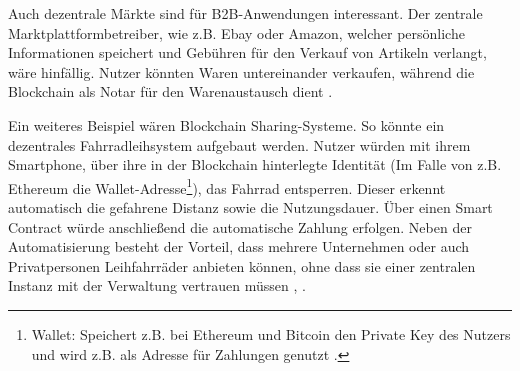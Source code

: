 Auch dezentrale Märkte sind für B2B-Anwendungen interessant. Der zentrale Marktplattformbetreiber, wie z.B. Ebay oder Amazon, welcher persönliche Informationen speichert und Gebühren für den Verkauf von Artikeln verlangt, wäre hinfällig. Nutzer könnten Waren untereinander verkaufen, während die Blockchain als Notar für den Warenaustausch dient \cite{BenHamidaBlockchainEnterpriseOverview2017}.

Ein weiteres Beispiel wären Blockchain Sharing-Systeme. So könnte ein dezentrales Fahrradleihsystem aufgebaut werden. Nutzer würden mit ihrem Smartphone, über ihre in der Blockchain hinterlegte Identität (Im Falle von z.B. Ethereum die Wallet-Adresse\footnote{Wallet: Speichert z.B. bei Ethereum und Bitcoin den Private Key des Nutzers und wird z.B. als Adresse für Zahlungen genutzt \cite{AntonopoulosMasteringbitcoin2015}.}), das Fahrrad entsperren. Dieser erkennt automatisch die gefahrene Distanz sowie die Nutzungsdauer. Über einen Smart Contract würde anschließend die automatische Zahlung erfolgen. Neben der Automatisierung besteht der Vorteil, dass mehrere Unternehmen oder auch Privatpersonen Leihfahrräder anbieten können, ohne dass sie einer zentralen Instanz mit der Verwaltung vertrauen müssen \cite{FutureFluxFestivalBlockchainBikes}, \cite{FischerIoTBlockchain}.
